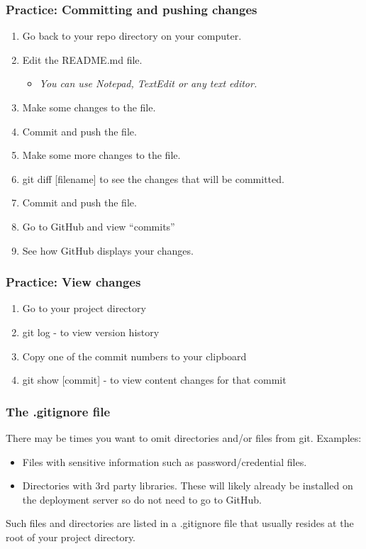 \documentclass{beamer}
\begin{document}
\begin{frame}\frametitle{Practice: Committing and pushing changes}
\begin{enumerate}
\item Go back to your repo directory on your computer.
\item Edit the README.md file.
\begin{itemize}
\item \emph{You can use Notepad, TextEdit or any text editor.}
\end{itemize}
\item Make some changes to the file.
\item Commit and push the file.
\item Make some more changes to the file.
\item git diff [filename] to see the changes that will be committed.
\item Commit and push the file.
\item Go to GitHub and view “commits”
\item See how GitHub displays your changes.
\end{enumerate}
\end{frame}

\begin{frame}\frametitle{Practice: View changes}
\begin{enumerate}
\item Go to your project directory
\item git log - to view version history
\item Copy one of the commit numbers to your clipboard
\item git show [commit] - to view content changes for that commit
\end{enumerate}
\end{frame}


\begin{frame}\frametitle{The .gitignore file}
There may be times you want to omit directories and/or files from git.\newline\newline
Examples:
\begin{itemize}
\item Files with sensitive information such as password/credential files.
\item Directories with 3rd party libraries. These will likely already be installed on the deployment server so do not need to go to GitHub.
\end{itemize}
\vspace{0.5cm}
Such files and directories are listed in a .gitignore file that usually resides at the root of your project directory.
\end{frame}
\end{document}
